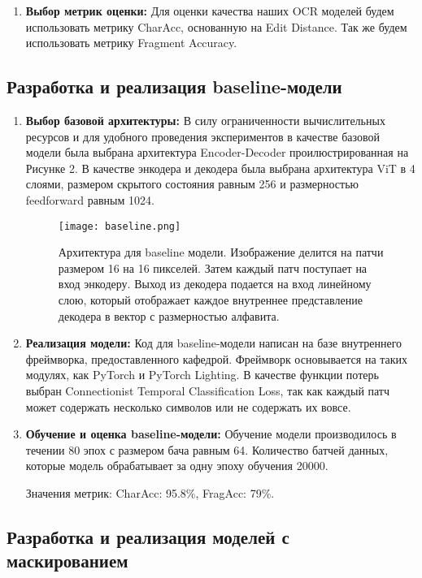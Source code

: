 \begin{enumerate}
     \item  \textbf{Выбор  метрик  оценки:}
      Для  оценки  качества  наших OCR моделей будем использовать метрику CharAcc, основанную на Edit Distance. Так же будем использовать метрику Fragment Accuracy.
\end{enumerate}

\subsection{Разработка и реализация  baseline-модели}

\begin{enumerate}
     \item  \textbf{Выбор  базовой  архитектуры:}
       В силу ограниченности вычислительных ресурсов и для удобного проведения экспериментов в качестве базовой модели была выбрана архитектура Encoder-Decoder проилюстрированная на Рисунке 2. В качестве энкодера и декодера была выбрана архитектура ViT в 4 слоями, размером скрытого состояния равным 256 и размерностью feedforward равным 1024.

       \begin{figure}[h!]
          \texttt{[image: baseline.png]}
          \caption{Архитектура для baseline модели. Изображение делится на патчи размером 16 на 16 пикселей. Затем каждый патч поступает на вход энкодеру. Выход из декодера подается на вход линейному слою, который отображает каждое внутреннее представление декодера в вектор с размерностью алфавита.}
      \end{figure}
     \item  \textbf{Реализация  модели:}
      Код  для  baseline-модели  написан на базе внутреннего фреймворка, предоставленного кафедрой. Фреймворк основывается на таких модулях, как PyTorch и PyTorch Lighting.
      В качестве функции потерь выбран Connectionist Temporal Classification Loss, так как каждый патч может содержать несколько символов или не содержать их вовсе.
      
     \item  \textbf{Обучение и оценка baseline-модели:}
      Обучение  модели производилось в течении 80 эпох с размером бача равным 64. Количество батчей данных, которые модель обрабатывает за одну эпоху обучения 20000.

      Значения метрик: CharAcc: 95.8\%, FragAcc: 79\%.
\end{enumerate}

\subsection{Разработка и реализация моделей с  маскированием}

